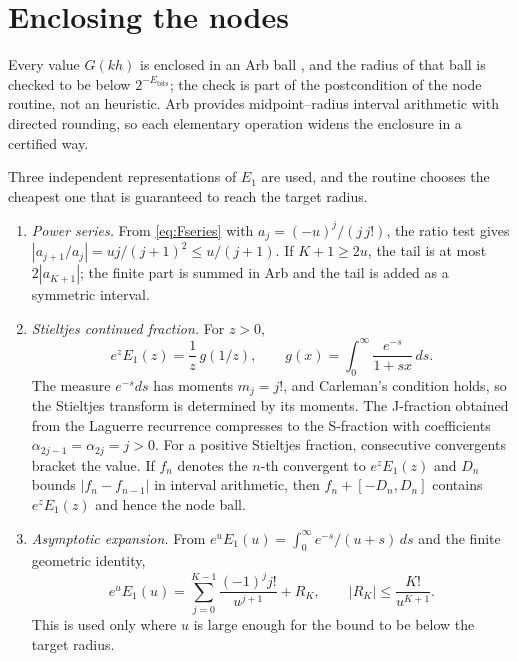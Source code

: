 \documentclass[11pt,a4paper]{article}
\theoremstyle{remark}
\newcommand{\Eone}{E_1}
\begin{document}
\section{Enclosing the nodes}

Every value $G(kh)$ is enclosed in an Arb ball \cite{johansson2017}, and
the radius of that ball is checked to be below $2^{-E_{\mathrm{bits}}}$;
the check is part of the postcondition of the node routine, not an
heuristic. Arb provides midpoint--radius interval arithmetic with
directed rounding, so each elementary operation widens the enclosure in
a certified way.

Three independent representations of $\Eone$ are used, and the routine
chooses the cheapest one that is guaranteed to reach the target radius.

\begin{enumerate}[leftmargin=1.6em]
\item \emph{Power series.} From \eqref{eq:Fseries} with
  $a_j=(-u)^j/(j\,j!)$, the ratio test gives
  $|a_{j+1}/a_j|=uj/(j+1)^2\le u/(j+1)$. If $K+1\ge2u$, the tail is at
  most $2|a_{K+1}|$; the finite part is summed in Arb and the tail is
  added as a symmetric interval.
\item \emph{Stieltjes continued fraction.} For $z>0$,
  \begin{equation}
    e^z\Eone(z)=\frac1z\,g(1/z),\qquad
    g(x)=\int_0^\infty\frac{e^{-s}}{1+sx}\,ds .
  \end{equation}
  The measure $e^{-s}ds$ has moments $m_j=j!$, and Carleman's condition
  holds, so the Stieltjes transform is determined by its moments. The
  J-fraction obtained from the Laguerre recurrence compresses to the
  S-fraction with coefficients $\alpha_{2j-1}=\alpha_{2j}=j>0$. For a
  positive Stieltjes fraction, consecutive convergents bracket the
  value. If $f_n$ denotes the $n$-th convergent to $e^z\Eone(z)$ and
  $D_n$ bounds $|f_n-f_{n-1}|$ in interval arithmetic, then
  $f_n+[-D_n,D_n]$ contains $e^z\Eone(z)$ and hence the node ball.
\item \emph{Asymptotic expansion.} From
  $e^u\Eone(u)=\int_0^\infty e^{-s}/(u+s)\,ds$ and the finite geometric
  identity,
  \begin{equation}
    e^u\Eone(u)=\sum_{j=0}^{K-1}\frac{(-1)^j j!}{u^{j+1}}+R_K,
    \qquad |R_K|\le\frac{K!}{u^{K+1}} .
  \end{equation}
  This is used only where $u$ is large enough for the bound to be below
  the target radius.
\end{enumerate}
\end{document}
